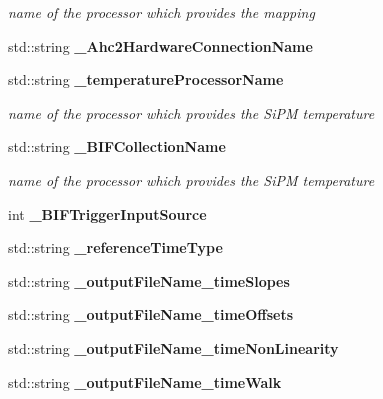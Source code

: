 \begin{DoxyCompactItemize}
\begin{DoxyCompactList}\small\item\em name of the processor which provides the mapping \end{DoxyCompactList}\item 
std\-::string {\bfseries \-\_\-\-Ahc2\-Hardware\-Connection\-Name}\label{classCALICE_1_1Ahc2TimeCalibrator_a1a27e778eeb532c45e45066c8a62e687}

\item 
std\-::string {\bf \-\_\-temperature\-Processor\-Name}\label{classCALICE_1_1Ahc2TimeCalibrator_a4514484c08b455b1aeacdcb9437b5891}

\begin{DoxyCompactList}\small\item\em name of the processor which provides the Si\-P\-M temperature \end{DoxyCompactList}\item 
std\-::string {\bf \-\_\-\-B\-I\-F\-Collection\-Name}\label{classCALICE_1_1Ahc2TimeCalibrator_a6e782c335d79533e8a07de0a4cd9e548}

\begin{DoxyCompactList}\small\item\em name of the processor which provides the Si\-P\-M temperature \end{DoxyCompactList}\item 
int {\bfseries \-\_\-\-B\-I\-F\-Trigger\-Input\-Source}\label{classCALICE_1_1Ahc2TimeCalibrator_a6892b48b05b8004283567cb4b92a4764}

\item 
std\-::string {\bfseries \-\_\-reference\-Time\-Type}\label{classCALICE_1_1Ahc2TimeCalibrator_ab5b5c93d447b33cac8235999fd187653}

\item 
std\-::string {\bfseries \-\_\-output\-File\-Name\-\_\-time\-Slopes}\label{classCALICE_1_1Ahc2TimeCalibrator_a56cdc5e9bc932c58edbd46c3bbca5230}

\item 
std\-::string {\bfseries \-\_\-output\-File\-Name\-\_\-time\-Offsets}\label{classCALICE_1_1Ahc2TimeCalibrator_a408ffd6f123e860d267744f7fa894783}

\item 
std\-::string {\bfseries \-\_\-output\-File\-Name\-\_\-time\-Non\-Linearity}\label{classCALICE_1_1Ahc2TimeCalibrator_a4ebb2345b37be10960e788ff9fb1160e}

\item 
std\-::string {\bfseries \-\_\-output\-File\-Name\-\_\-time\-Walk}\label{classCALICE_1_1Ahc2TimeCalibrator_a7366ba658069d92b966e321aa340fb31}


\end{DoxyCompactItemize}
